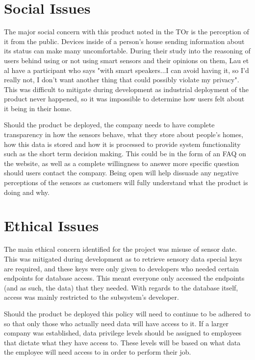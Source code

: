 \documentclass[]{report}
\begin{document}
\section{Social Issues}
The major social concern with this product noted in the TOr is the perception of it from the public. Devices inside of a person's house sending information about its status can make many uncomfortable. During their study into the reasoning of users behind using or not using smart sensors and their opinions on them, Lau et al\cite{lau2018alexa} have a participant who says "with smart speakers...I can avoid having it, so I’d really not, I don’t want another thing that could possibly violate my privacy". This was difficult to mitigate during development as industrial deployment of the product never happened, so it was impossible to determine how users felt about it being in their home.

Should the product be deployed, the company needs to have complete transparency in how the sensors behave, what they store about people's homes, how this data is stored and how it is processed to provide system functionality such as the short term decision making. This could be in the form of an FAQ on the website, as well as a complete willingness to answer more specific question should users contact the company. Being open will help dissuade any negative perceptions of the sensors as customers will fully understand what the product is doing and why.

\section{Ethical Issues}
The main ethical concern identified for the project was misuse of sensor date. This was mitigated during development as to retrieve sensory data special keys are required, and these keys were only given to developers who needed certain endpoints for database access. This meant everyone only accessed the endpoints (and as such, the data) that they needed. With regards to the database itself, access was mainly restricted to the subsystem's developer.

Should the product be deployed this policy will need to continue to be adhered to so that only those who actually need data will have access to it. If a larger company was established, data privilege levels should be assigned to employees that dictate what they have access to. These levels will be based on what data the employee will need access to in order to perform their job.
\end{document}
